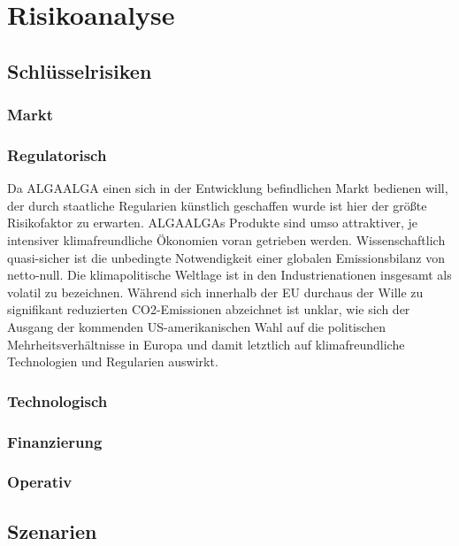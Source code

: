 \chapter{Risikoanalyse}

    \section{Schlüsselrisiken}

        \subsection{Markt}

        \subsection{Regulatorisch}
            Da ALGAALGA einen sich in der Entwicklung befindlichen Markt bedienen will, der durch staatliche Regularien künstlich geschaffen wurde ist hier der größte Risikofaktor zu erwarten.
            ALGAALGAs Produkte sind umso attraktiver, je intensiver klimafreundliche Ökonomien voran getrieben werden. 
            Wissenschaftlich quasi-sicher ist die unbedingte Notwendigkeit einer globalen Emissionsbilanz von netto-null.
            Die klimapolitische Weltlage ist in den Industrienationen insgesamt als volatil zu bezeichnen.
            Während sich innerhalb der EU durchaus der Wille zu signifikant reduzierten CO2-Emissionen abzeichnet ist unklar, wie sich der Ausgang der kommenden US-amerikanischen Wahl auf die politischen Mehrheitsverhältnisse in Europa und damit letztlich auf klimafreundliche Technologien und Regularien auswirkt.
            
        \subsection{Technologisch}

        \subsection{Finanzierung}

        \subsection{Operativ}
    
    \section{Szenarien}

